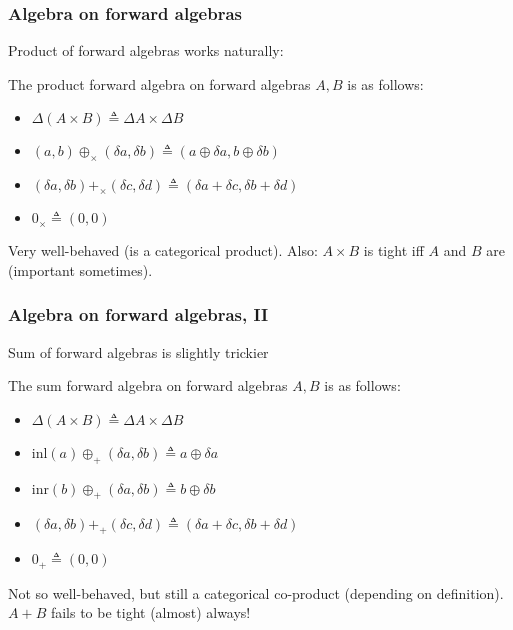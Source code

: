 \documentclass[english]{beamer}
\theoremstyle{plain}
\theoremstyle{remark}
\theoremstyle{remark}
\theoremstyle{remark}
\theoremstyle{definition}
\theoremstyle{definition}
\newcommand{\defeq}[0]{\triangleq}
\begin{document}
\begin{frame}
  \frametitle{Algebra on forward algebras}
  Product of forward algebras works naturally:
  \vfill
  \begin{definition}
    The product forward algebra on forward algebras $A, B$ is as follows:
    \begin{itemize}
      \item $\Delta (A \times B) \defeq \Delta A \times \Delta B$
      \item $(a, b) \oplus_\times (\delta a, \delta b) \defeq (a \oplus \delta a, b \oplus \delta b)$
      \item $(\delta a, \delta b) +_\times (\delta c, \delta d)
        \defeq (\delta a + \delta c, \delta b + \delta d)$
      \item $0_\times \defeq (0, 0)$
    \end{itemize}
  \end{definition}
  \vfill
  Very well-behaved (is a categorical product).
  \vfill
  Also: $A \times B$ is tight iff $A$ and $B$ are (important sometimes).
\end{frame}

\begin{frame}
  \frametitle{Algebra on forward algebras, II}
  Sum of forward algebras is slightly trickier
  \vfill
  \begin{definition}
    The sum forward algebra on forward algebras $A, B$ is as follows:
    \begin{itemize}
      \item $\Delta (A \times B) \defeq \Delta A \times \Delta B$
      \item $\text{inl}(a) \oplus_+ (\delta a, \delta b) \defeq a \oplus \delta a$
      \item $\text{inr}(b) \oplus_+ (\delta a, \delta b) \defeq b \oplus \delta b$
      \item $(\delta a, \delta b) +_+ (\delta c, \delta d)
        \defeq (\delta a + \delta c, \delta b + \delta d)$
      \item $0_+ \defeq (0, 0)$
    \end{itemize}
  \end{definition}
  \vfill
  Not so well-behaved, but still a categorical co-product (depending on definition).
  \vfill
  $A + B$ fails to be tight (almost) always!
\end{frame}
\end{document}
